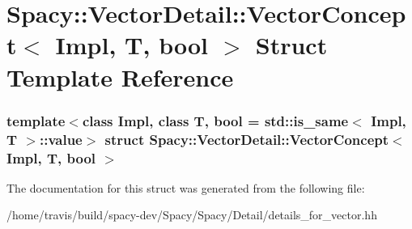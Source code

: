 \hypertarget{structSpacy_1_1VectorDetail_1_1VectorConcept}{\section{\-Spacy\-:\-:\-Vector\-Detail\-:\-:\-Vector\-Concept$<$ \-Impl, \-T, bool $>$ \-Struct \-Template \-Reference}
\label{structSpacy_1_1VectorDetail_1_1VectorConcept}
}
\subsubsection*{template$<$class Impl, class T, bool = std\-::is\-\_\-same$<$ Impl, T $>$\-::value$>$ struct Spacy\-::\-Vector\-Detail\-::\-Vector\-Concept$<$ Impl, T, bool $>$}



\-The documentation for this struct was generated from the following file\-:\begin{DoxyCompactItemize}
\item 
/home/travis/build/spacy-\/dev/\-Spacy/\-Spacy/\-Detail/details\-\_\-for\-\_\-vector.\-hh\end{DoxyCompactItemize}
